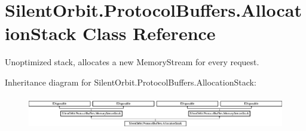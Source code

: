 \hypertarget{class_silent_orbit_1_1_protocol_buffers_1_1_allocation_stack}{}\section{Silent\+Orbit.\+Protocol\+Buffers.\+Allocation\+Stack Class Reference}
\label{class_silent_orbit_1_1_protocol_buffers_1_1_allocation_stack}


Unoptimized stack, allocates a new Memory\+Stream for every request.  


Inheritance diagram for Silent\+Orbit.\+Protocol\+Buffers.\+Allocation\+Stack\+:\begin{figure}[H]
\begin{center}
\leavevmode
\includegraphics[height=1.443299cm]{class_silent_orbit_1_1_protocol_buffers_1_1_allocation_stack}
\end{center}
\end{figure}
